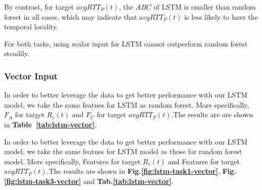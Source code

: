 \documentclass[sigconf]{acmart}
\begin{document}
	By contrast, for target $avgRTT_P(t)$, the $ABC$ of LSTM is smaller than random forest in all cases, which may indicate that $avgRTT_P(t)$ is less likely to have the temporal locality.
	
	For both tasks, using scalar input for LSTM cannot outperform random forest steadily.
	
	\subsubsection{Vector Input}
	In order to better leverage the data to get better performance with our LSTM model, we take the same featues for LSTM as random forest. More specifically, $F_A$ for target $R_r(t)$ and $F_C$ for target $avgRTT_P(t)$.The results are are shown in \textbf{Table~\ref{tab:lstm-vector}}.
	
	In order to better leverage the data to get better performance with our LSTM model, we take the same featues for LSTM model as those for random forest model. More specifically, Features for target $R_r(t)$ and Features for target $avgRTT_P(t)$.The results are shown in \textbf{Fig.\ref{fig:lstm-task1-vector}}, \textbf{Fig.\ref{fig:lstm-task3-vector}} and \textbf{Tab.\ref{tab:lstm-vector}}.
	
\end{document}
